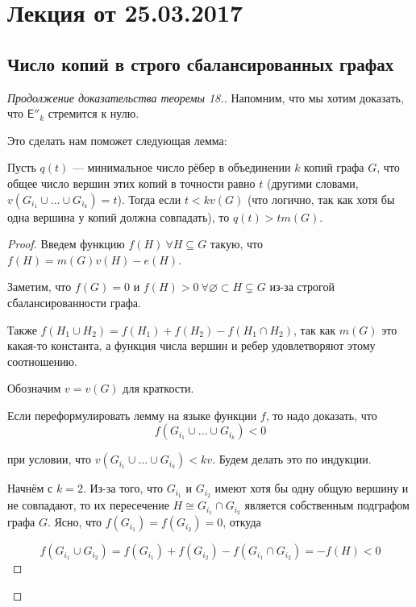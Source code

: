 \section{Лекция от 25.03.2017}

\subsection{Число копий в строго сбалансированных графах}

\begin{proof}[Продолжение доказательства теоремы 18.]
  Напомним, что мы хотим доказать, что  $\mathsf{E''}_k$ стремится к нулю.

  Это сделать нам поможет следующая лемма:

  \begin{lemma}
    Пусть $q(t)$ --- минимальное число рёбер в объединении $k$ копий графа $G$,
    что общее число вершин этих копий в точности равно $t$ (другими словами,
    $v(G_{i_1} \cup \ldots \cup G_{i_k}) = t$). Тогда если $t < k v(G)$ (что
    логично, так как хотя бы одна вершина у копий должна совпадать),
    то $q(t) > t m(G)$.
  \end{lemma}

  \begin{proof}
    Введем функцию $f(H) \ \forall H \subseteq G$ такую, что $f(H) = m(G)v(H) - e(H)$.

    Заметим, что $f(G) = 0$ и $f(H) > 0
    \ \forall \varnothing \subset H \varsubsetneq G$ из-за строгой сбалансированности графа.

    Также $f(H_1 \cup H_2) = f(H_1) + f(H_2) - f(H_1 \cap H_2)$, так как $m(G)$
    это какая-то константа, а функция числа вершин и ребер удовлетворяют этому 
    соотношению.

    Обозначим $v = v(G)$ для краткости.

    Если переформулировать лемму на языке функции $f$, то надо доказать, что
    \[
    f(G_{i_1} \cup \ldots \cup G_{i_k}) < 0
    \]

    при условии, что 
    $v(G_{i_1} \cup \ldots \cup G_{i_k}) < kv$. Будем делать это по индукции.

    Начнём с $k = 2$. Из-за того, что $G_{i_1}$ и $G_{i_2}$ имеют хотя бы одну
    общую вершину и не совпадают,
    то их пересечение $H \cong G_{i_1} \cap G_{i_2}$ является
    собственным подграфом графа $G$. Ясно, что $f(G_{i_1}) = f(G_{i_2}) = 0$, откуда

    \[
      f(G_{i_1} \cup G_{i_2}) = f(G_{i_1}) + f(G_{i_2}) - f(G_{i_1} \cap G_{i_2})=
      -f(H) < 0
    \]


\end{proof}
\end{proof}
